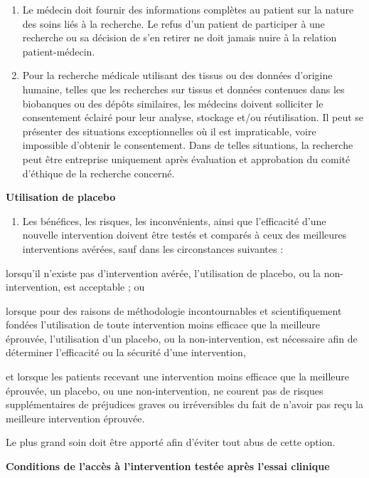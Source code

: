\documentclass[
  12pt,
]{book}
\providecommand{\tightlist}{%
  \setlength{\itemsep}{0pt}\setlength{\parskip}{0pt}}
\begin{document}
\begin{enumerate}
\def\labelenumi{\arabic{enumi}.}
\setcounter{enumi}{30}
\item
  Le médecin doit fournir des informations complètes au patient sur la nature des soins liés à la recherche. Le refus d'un patient de participer à une recherche ou sa décision de s'en retirer ne doit jamais nuire à la relation patient-médecin.
\item
  Pour la recherche médicale utilisant des tissus ou des données d'origine humaine, telles que les recherches sur tissus et données contenues dans les biobanques ou des dépôts similaires, les médecins doivent solliciter le consentement éclairé pour leur analyse, stockage et/ou réutilisation. Il peut se présenter des situations exceptionnelles où il est impraticable, voire impossible d'obtenir le consentement. Dans de telles situations, la recherche peut être entreprise uniquement après évaluation et approbation du comité d'éthique de la recherche concerné.
\end{enumerate}

\textbf{Utilisation de placebo}

\begin{enumerate}
\def\labelenumi{\arabic{enumi}.}
\setcounter{enumi}{32}
\tightlist
\item
  Les bénéfices, les risques, les inconvénients, ainsi que l'efficacité d'une nouvelle intervention doivent être testés et comparés à ceux des meilleures interventions avérées, sauf dans les circonstances suivantes :
\end{enumerate}

lorsqu'il n'existe pas d'intervention avérée, l'utilisation de placebo, ou la non-intervention, est acceptable ; ou

lorsque pour des raisons de méthodologie incontournables et scientifiquement fondées l'utilisation de toute intervention moins efficace que la meilleure éprouvée, l'utilisation d'un placebo, ou la non-intervention, est nécessaire afin de déterminer l'efficacité ou la sécurité d'une intervention,

et lorsque les patients recevant une intervention moins efficace que la meilleure éprouvée, un placebo, ou une non-intervention, ne courent pas de risques supplémentaires de préjudices graves ou irréversibles du fait de n'avoir pas reçu la meilleure intervention éprouvée.

Le plus grand soin doit être apporté afin d'éviter tout abus de cette option.

\textbf{Conditions de l'accès à l'intervention testée après l'essai clinique}
\end{document}
